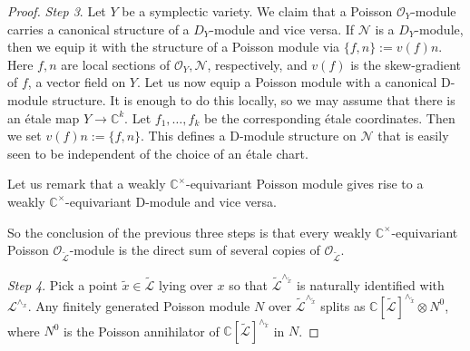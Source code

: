 \documentclass[12pt]{amsart}
\newcommand{\C}{\mathbb{C}}
\newcommand{\Leaf}{\mathcal{L}}
\theoremstyle{definition}
\begin{document}
\begin{proof}
{\it Step 3}. Let $Y$ be a symplectic variety.  We claim that a Poisson $\mathcal{O}_{Y}$-module
carries a canonical structure of a $D_{Y}$-module and vice versa. If $\mathcal{N}$ is a $D_Y$-module,
then we equip it with the structure of a Poisson module via $\{f,n\}:=v(f)n$. Here $f,n$ are local
sections of $\mathcal{O}_Y, \mathcal{N}$, respectively, and $v(f)$ is the skew-gradient of $f$,
a vector field on $Y$. Let us now equip a Poisson module with a canonical D-module structure.
It is enough to do this locally, so we may assume that there is an \'{e}tale map $Y\rightarrow \C^k$.
Let $f_1,\ldots,f_k$ be the corresponding \'{e}tale coordinates. Then we set $v(f)n:=\{f,n\}$. This defines
a D-module structure on $\mathcal{N}$ that is easily seen to be independent of the choice of an
\'{e}tale chart.

Let us remark that a weakly $\C^\times$-equivariant Poisson module gives rise to a weakly $\C^\times$-equivariant
D-module and vice versa.

So the conclusion of the previous three steps is that every weakly $\C^\times$-equivariant Poisson $\mathcal{O}_{\widetilde{\Leaf}}$-module is the direct sum of several copies of $\mathcal{O}_{\widetilde{\Leaf}}$.

{\it Step 4}. Pick a point $\tilde{x}\in \widetilde{\Leaf}$ lying over $x$ so that $\widetilde{\Leaf}^{\wedge_{\tilde{x}}}$
is naturally identified with $\Leaf^{\wedge_x}$. Any finitely generated Poisson module $N$ over $\widetilde{\Leaf}^{\wedge_{\tilde{x}}}$
splits as $\C[\widetilde{\Leaf}]^{\wedge_{\tilde{x}}}\otimes N^0$, where $N^0$
is the Poisson annihilator of $\C[\widetilde{\Leaf}]^{\wedge_{\tilde{x}}}$ in $N$.


\end{proof}
\end{document}
